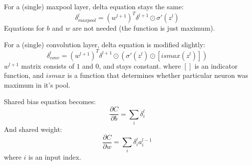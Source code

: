 \documentclass{article}
\begin{document}
For a (single) maxpool layer, delta equation stays the same:
$$\delta^{l}_{maxpool} = (w^{l+1})^{T} \delta^{l+1}\odot\sigma'(z^l)$$
Equations for $b$ and $w$ are not needed (the function is just maximum).

For a (single) convolution layer, delta equation is modified slightly:
$$\delta^{l}_{conv} = (w^{l+1})^{T} \delta^{l+1}\odot(\sigma'(z^l)\odot[ismax(z^l)])$$
$w^{l+1}$ matrix consists of $1$ and $0$, and stays constant.
where $[]$ is an indicator function, and $ismax$ is a function that determines whether particular
neuron was maximum in it's pool.

Shared bias equation becomes:
$$\frac{\partial C}{\partial b} = \sum_i \delta^l_i$$
And shared weight:
$$\frac{\partial C}{\partial w} = \sum_i \delta^l_i a^{l-1}_{i}$$
where $i$ is an input index.
\end{document}
